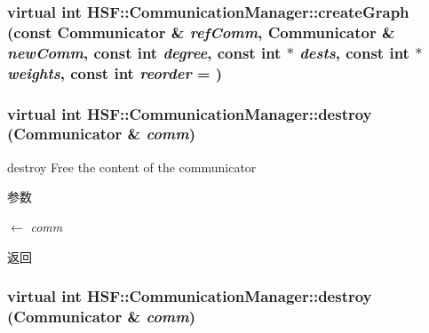 \label{classHSF_1_1CommunicationManager_a6740c20953c04b2283a830b8f1226d9f}
\hypertarget{classHSF_1_1CommunicationManager_a6740c20953c04b2283a830b8f1226d9f}{
\subsubsection[{createGraph}]{\setlength{\rightskip}{0pt plus 5cm}virtual int HSF::CommunicationManager::createGraph (const {\bf Communicator} \& {\em refComm}, \/  {\bf Communicator} \& {\em newComm}, \/  const int {\em degree}, \/  const int $\ast$ {\em dests}, \/  const int $\ast$ {\em weights}, \/  const int {\em reorder} = {})}}
\label{classHSF_1_1CommunicationManager_a6740c20953c04b2283a830b8f1226d9f}
\hypertarget{classHSF_1_1CommunicationManager_ab1ce47822ae286b8e08be0a796f3feea}{
\subsubsection[{destroy}]{\setlength{\rightskip}{0pt plus 5cm}virtual int HSF::CommunicationManager::destroy ({\bf Communicator} \& {\em comm})}}
\label{classHSF_1_1CommunicationManager_ab1ce47822ae286b8e08be0a796f3feea}


destroy Free the content of the communicator 
\begin{DoxyParams}{参数}
\item[\mbox{$\leftarrow$} {\em comm}]\end{DoxyParams}
\begin{DoxyReturn}{返回}

\end{DoxyReturn}
\hypertarget{classHSF_1_1CommunicationManager_ab1ce47822ae286b8e08be0a796f3feea}{
\subsubsection[{destroy}]{\setlength{\rightskip}{0pt plus 5cm}virtual int HSF::CommunicationManager::destroy ({\bf Communicator} \& {\em comm})}}
\label{classHSF_1_1CommunicationManager_ab1ce47822ae286b8e08be0a796f3feea}


